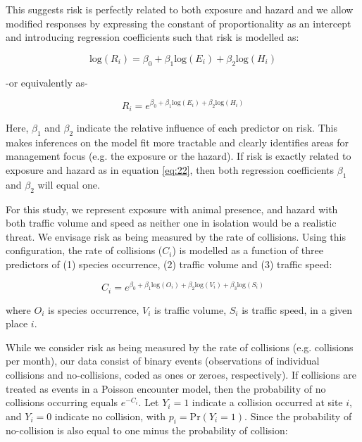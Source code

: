 This suggests risk is perfectly related to both exposure and hazard and we allow modified responses by expressing the constant of proportionality as an intercept and introducing regression coefficients such that risk is modelled as: 

\begin{equation} \label{eq:23}
\text{log}(R_i)=\beta_0+\beta_1\text{log}(E_i)+\beta_2\text{log}(H_i)
\end{equation}

\begin{center}
-or equivalently as-
\end{center}

\begin{equation} \label{eq:24}
R_i=e^{\beta_0+\beta_1\text{log}(E_i)+\beta_2\text{log}(H_i)}
\end{equation}

Here, $\beta_1$ and $\beta_2$ indicate the relative influence of each predictor on risk. This makes inferences on the model fit more tractable and clearly identifies areas for management focus (e.g. the exposure or the hazard). If risk is exactly related to exposure and hazard as in equation \ref{eq:22}, then both regression coefficients $\beta_1$ and $\beta_2$ will equal one.

For this study, we represent exposure with animal presence, and hazard with both traffic volume and speed as neither one in isolation would be a realistic threat. We envisage risk as being measured by the rate of collisions. Using this configuration, the rate of collisions ($C_i$) is modelled as a function of three predictors of (1) species occurrence, (2) traffic volume and (3) traffic speed: 
 
\begin{equation} \label{eq:25}
C_i=e^{\beta_0+\beta_1\text{log}(O_i)+\beta_2\text{log}(V_i)+\beta_3\text{log}(S_i)}
\end{equation}

where $O_i$ is species occurrence, $V_i$ is traffic volume, $S_i$ is traffic speed, in a given place $i$.

While we consider risk as being measured by the rate of collisions (e.g. collisions per month), our data consist of binary events (observations of individual collisions and no-collisions, coded as ones or zeroes, respectively). If collisions are treated as events in a Poisson encounter model, then the probability of no collisions occurring equals $e^{-C_i}$. Let $Y_i=1$ indicate a collision occurred at site $i$, and $Y_i=0$ indicate no collision, with $p_i=\text{Pr}(Y_i=1)$. Since the probability of no-collision is also equal to one minus the probability of collision:

